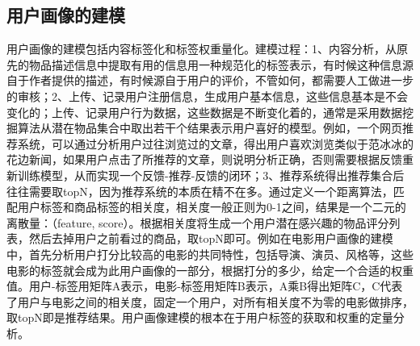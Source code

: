 		\begin{figure}
	    \centering
	      \label{pic:user_profile}
	    \end{figure}

		\subsection{用户画像的建模}
		用户画像的建模包括内容标签化和标签权重量化。建模过程：1、内容分析，从原先的物品描述信息中提取有用的信息用一种规范化的标签表示，有时候这种信息源自于作者提供的描述，有时候源自于用户的评价，不管如何，都需要人工做进一步的审核；2、上传、记录用户注册信息，生成用户基本信息，这些信息基本是不会变化的；上传、记录用户行为数据，这些数据是不断变化着的，通常是采用数据挖掘算法从潜在物品集合中取出若干个结果表示用户喜好的模型。例如，一个网页推荐系统，可以通过分析用户过往浏览过的文章，得出用户喜欢浏览类似于范冰冰的花边新闻，如果用户点击了所推荐的文章，则说明分析正确，否则需要根据反馈重新训练模型，从而实现一个反馈-推荐-反馈的闭环；3、推荐系统得出推荐集合后往往需要取topN，因为推荐系统的本质在精不在多。通过定义一个距离算法，匹配用户标签和商品标签的相关度，相关度一般正则为0-1之间，结果是一个二元的离散量：（feature, score）。根据相关度将生成一个用户潜在感兴趣的物品评分列表，然后去掉用户之前看过的商品，取topN即可。例如在电影用户画像的建模中，首先分析用户打分比较高的电影的共同特性，包括导演、演员、风格等，这些电影的标签就会成为此用户画像的一部分，根据打分的多少，给定一个合适的权重值。用户-标签用矩阵A表示，电影-标签用矩阵B表示，A乘B得出矩阵C，C代表了用户与电影之间的相关度，固定一个用户，对所有相关度不为零的电影做排序，取topN即是推荐结果。用户画像建模的根本在于用户标签的获取和权重的定量分析。

